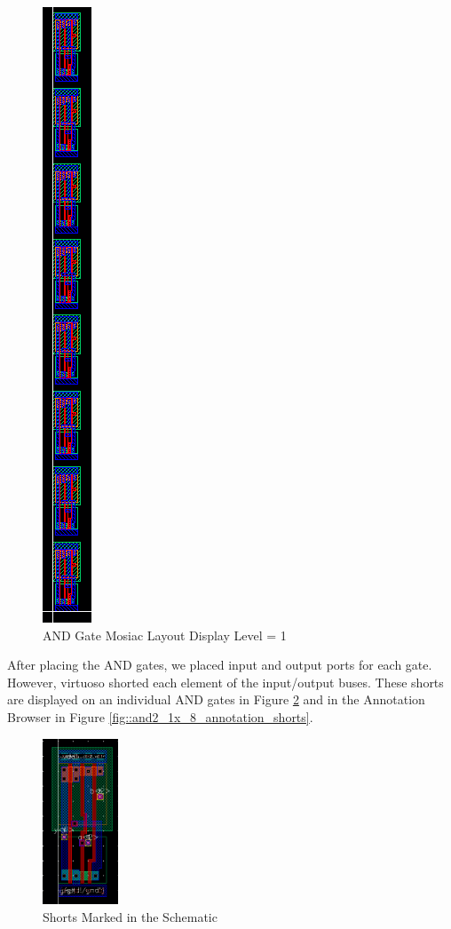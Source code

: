 \documentclass{article}
\begin{document}
	\begin{figure}[H]
		\centerline{\includegraphics[height=0.8\textwidth, angle=270]{and2_1x_8_layout_detailed.png}}
		\caption{AND Gate Mosiac Layout Display Level = 1}
		\label{fig::and2_1x_8_layout_detailed}
	\end{figure}
	
	\noindent After placing the AND gates, we placed input and output ports for each gate. However, virtuoso shorted each element of the input/output buses. These shorts are displayed on an individual AND gates in Figure \ref{fig::and2_1x_8_cell_with_shorts} and in the Annotation Browser in Figure \ref{fig::and2_1x_8_annotation_shorts}. 
	
	\begin{figure}[H]
		\centerline{\includegraphics[width=0.2\textwidth]{and2_1x_8_cell_with_shorts.png}}
		\caption{Shorts Marked in the Schematic}
		\label{fig::and2_1x_8_cell_with_shorts}
	\end{figure}
	
\end{document}
